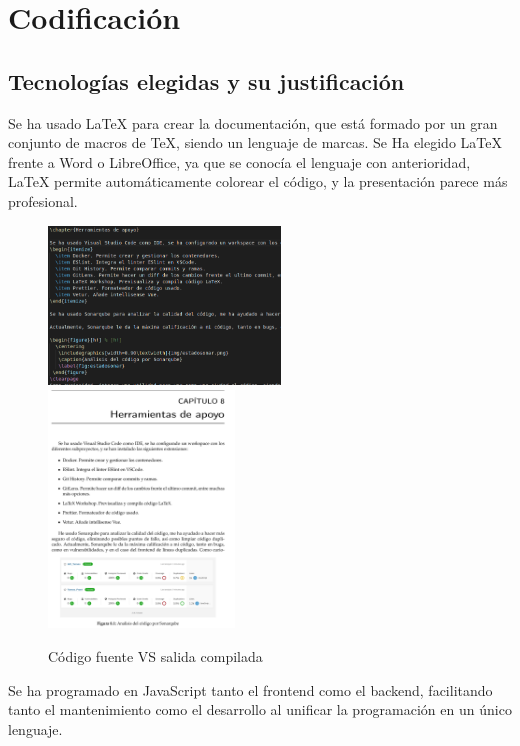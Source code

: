 \documentclass[11pt,spanish,listoffigures,listoftables]{tfgetsinf}
\begin{document}
\chapter{Codificación}

\section{Tecnologías elegidas y su justificación}

Se ha usado \LaTeX{} para crear la documentación, que está formado por un gran conjunto de macros de TeX, siendo un lenguaje de marcas. 
Se Ha elegido \LaTeX{} frente a Word o LibreOffice, ya que se conocía el lenguaje con anterioridad, \LaTeX{} permite automáticamente colorear el código, y la presentación parece más profesional.

\begin{figure}[ht!] %
  \includegraphics[width=0.55\textwidth]{img/LatexCode2.png}
  \includegraphics[width=0.44\textwidth]{img/LatexCompilado.png}
  \caption{Código fuente VS salida compilada}
  \label{fig:Latex}
\end{figure}

Se ha programado en JavaScript tanto el frontend como el backend, facilitando tanto el mantenimiento como el desarrollo al unificar la programación en un único lenguaje.
\end{document}

